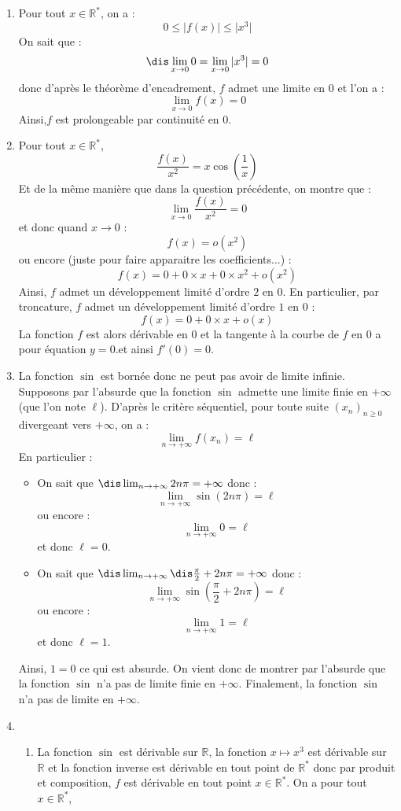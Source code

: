 \documentclass[a4paper,10pt]{report}
\begin{document}
\corr \begin{enumerate}
\item Pour tout $x \in \mathbb{R}^*$, on a :
$$ 0 \leq \vert f(x) \vert \leq \vert x^3 \vert$$
On sait que :
$$\dis \lim_{x \rightarrow 0} 0 = \lim_{x \rightarrow 0} \vert x^3 \vert = 0$$
donc d'après le théorème d'encadrement, $f$ admet une limite en $0$ et l'on a :
$$ \lim_{x \rightarrow 0} f(x) = 0$$
Ainsi,$f$ est prolongeable par continuité en $0$.
\item Pour tout $x \in \mathbb{R}^*$, 
$$ \dfrac{f(x)}{x^2} = x \cos \left( \frac{1}{x} \right) $$
Et de la même manière que dans la question précédente, on montre que :
$$ \lim_{x \rightarrow 0} \dfrac{f(x)}{x^2} = 0$$
et donc quand $x \rightarrow 0$ :
$$ f(x) = o(x^2)$$
ou encore (juste pour faire apparaitre les coefficients...) :
$$ f(x) = 0 + 0 \times x + 0 \times x^2+ o(x^2)$$
Ainsi, $f$ admet un développement limité d'ordre $2$ en $0$. En particulier, par troncature, $f$ admet un développement limité d'ordre $1$ en $0$ :
$$ f(x) = 0 + 0 \times x + o(x)$$
La fonction $f$ est alors dérivable en $0$ et la tangente à la courbe de $f$ en $0$ a pour équation $y=0$.et ainsi $f'(0)=0$. 
\item La fonction $\sin$ est bornée donc ne peut pas avoir de limite infinie. Supposons par l'absurde que la fonction $\sin$ admette une limite finie en $+ \infty$ (que l'on note $\ell$). D'après le critère séquentiel, pour toute suite $(x_n)_{n \geq 0}$ divergeant vers $+ \infty$, on a :
$$ \lim_{n \rightarrow + \infty} f(x_n) = \ell$$
En particulier :
\begin{itemize}
\item On sait que $\dis \lim_{n \rightarrow + \infty} 2n \pi = + \infty$ donc :
$$ \lim_{n \rightarrow + \infty} \sin(2n \pi) = \ell$$
ou encore :
$$ \lim_{n \rightarrow + \infty} 0 = \ell$$
et donc $\ell =0$.
\item On sait que $\dis \lim_{n \rightarrow + \infty} \dis \frac{\pi}{2} + 2n \pi = + \infty$ donc :
$$ \lim_{n \rightarrow + \infty} \sin \left( \frac{\pi}{2} + 2n \pi \right) = \ell$$
ou encore :
$$ \lim_{n \rightarrow + \infty} 1 = \ell$$
et donc $\ell =1$.
\end{itemize}
Ainsi, $1=0$ ce qui est absurde. On vient donc de montrer par l'absurde que la fonction $\sin$ n'a pas de limite finie en $+ \infty$. Finalement, la fonction $\sin$ n'a pas de limite en $+ \infty$.
\item 
\begin{enumerate}
\item La fonction $\sin$ est dérivable sur $\mathbb{R}$, la fonction $x \mapsto x^3$ est dérivable sur $\mathbb{R}$ et la fonction inverse est dérivable en tout point de $\mathbb{R}^*$ donc par produit et composition, $f$ est dérivable en tout point $x \in \mathbb{R}^*$. On a pour tout $x \in  \mathbb{R}^*$,

\end{enumerate}
\end{enumerate}
\end{document}
